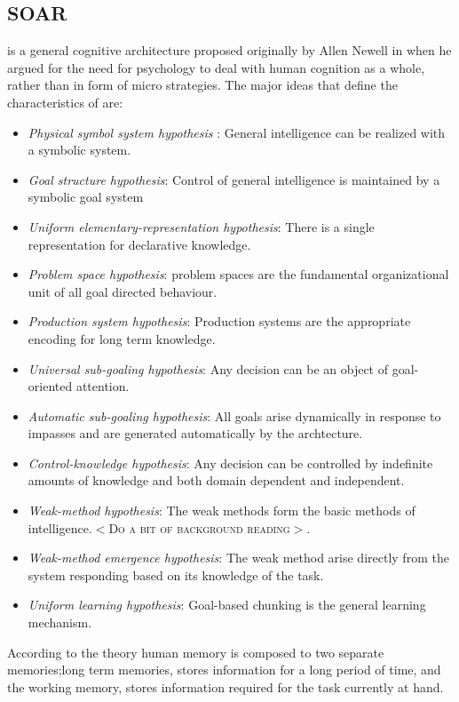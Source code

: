 
\subsection{SOAR}

\soar is a general cognitive architecture proposed originally by Allen
Newell in \cite{Newell:1990aa,27702} when he argued for the need for
psychology to deal with human cognition as a whole, rather than in
form of micro strategies. The major ideas\cite{Lewis:2001aa, 27702} that
define the characteristics of \soar are:

\begin{itemize}
\item \emph{Physical symbol system hypothesis} : General intelligence
  can be realized with a symbolic system\cite{Newell1980135}.
\item \emph{Goal structure hypothesis}: Control of general
  intelligence is maintained by a symbolic goal system
\item \emph{Uniform elementary-representation hypothesis}: There is a
  single representation for declarative knowledge.
\item \emph{Problem space hypothesis}: problem spaces are the
  fundamental organizational unit of all goal directed behaviour.
\item \emph{Production system hypothesis}: Production systems are the
  appropriate encoding for long term knowledge.
\item \emph{Universal sub-goaling hypothesis}: Any decision can be an
  object of goal-oriented attention.
\item \emph{Automatic sub-goaling hypothesis}: All goals arise
  dynamically in response to impasses and are generated automatically
  by the archtecture.
\item \emph{Control-knowledge hypothesis}: Any decision can be
  controlled by indefinite amounts of knowledge and both domain
  dependent and independent.
\item \emph{Weak-method hypothesis}: The weak methods form the basic
  methods of intelligence.$<$\textsc{Do a bit of background reading$>$}.
\item \emph{Weak-method emergence hypothesis}: The weak method arise
  directly from the system responding based on its knowledge of the
  task.
\item \emph{Uniform learning hypothesis}: Goal-based chunking is the
  general learning mechanism.
\end{itemize}
According to the \soar theory human memory is composed to two separate
memories;long term memories, stores information for a long period of
time, and the working memory, stores information required for the task
currently at hand. 

